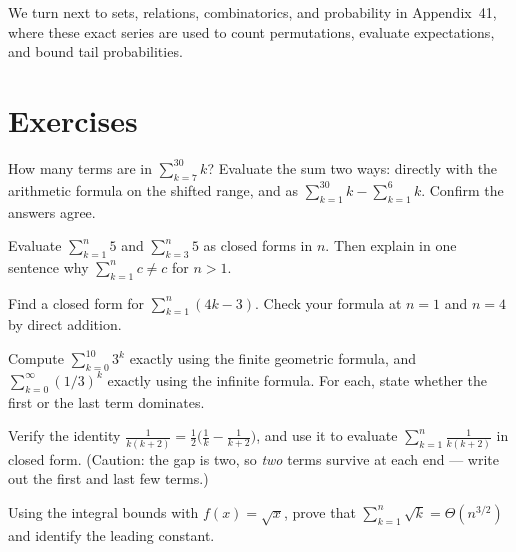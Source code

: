 We turn next to sets, relations,
combinatorics, and probability in Appendix~41, where these exact
series are used to count permutations, evaluate expectations, and bound tail
probabilities.

\section*{Exercises}
\label{ch37:exercises}

\begin{exercise}
\label{ch37:ex1}
How many terms are in $\sum_{k=7}^{30} k$? Evaluate the sum two ways: directly
with the arithmetic formula on the shifted range, and as
$\sum_{k=1}^{30} k - \sum_{k=1}^{6} k$. Confirm the answers agree.
\end{exercise}

\begin{exercise}
\label{ch37:ex2}
Evaluate $\sum_{k=1}^{n} 5$ and $\sum_{k=3}^{n} 5$ as closed forms in $n$. Then
explain in one sentence why $\sum_{k=1}^{n} c \ne c$ for $n > 1$.
\end{exercise}

\begin{exercise}
\label{ch37:ex3}
Find a closed form for $\sum_{k=1}^{n}(4k - 3)$. Check your formula at $n=1$ and
$n=4$ by direct addition.
\end{exercise}

\begin{exercise}
\label{ch37:ex4}
Compute $\sum_{k=0}^{10} 3^k$ exactly using the finite geometric formula, and
$\sum_{k=0}^{\infty} (1/3)^k$ exactly using the infinite formula. For each, state
whether the first or the last term dominates.
\end{exercise}

\begin{exercise}
\label{ch37:ex5}
Verify the identity $\frac{1}{k(k+2)} = \frac12\bigl(\frac1k - \frac{1}{k+2}\bigr)$,
and use it to evaluate $\sum_{k=1}^{n}\frac{1}{k(k+2)}$ in closed form. (Caution: the gap is
two, so \emph{two} terms survive at each end --- write out the first and last few
terms.)
\end{exercise}

\begin{exercise}
\label{ch37:ex6}
Using the integral bounds with $f(x) = \sqrt{x}$, prove that
$\sum_{k=1}^{n} \sqrt{k} = \Theta(n^{3/2})$ and identify the leading constant.
\end{exercise}

